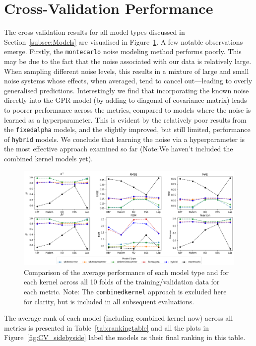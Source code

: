 \documentclass{ucdgradtaughtthesis}
\begin{document}
\section{Cross-Validation Performance}
The cross validation results for all model types discussed in Section~\ref{subsec:Models} are visualised in Figure~\ref{fig:broad_comparison}. A few notable observations emerge. Firstly, the \texttt{montecarlo} noise modeling method performs poorly.
This may be due to the fact that the noise associated with our data is relatively large. When sampling different noise levels, this results in a mixture of large and small noise systems whose effects, when averaged, tend to cancel out—leading to overly generalised predictions.
Interestingly we find that incorporating the known noise directly into the GPR model (by adding to diagonal of covariance matrix) leads to poorer performance across the metrics, compared to models where the noise is learned as a hyperparameter.
This is evident by the relatively poor results from the \texttt{fixedalpha} models, and the slightly improved, but still limited, performance of \texttt{hybrid} models.
We conclude that learning the noise via a hyperparameter is the most effective approach examined so far (Note:We haven't included the combined kernel models yet).
\begin{figure}[H]
    \centering
    \includegraphics[width=\textwidth]{LatexPlots/CV_plots/metrics_compared.png}
    \caption[Comparing average metrics over all cross validation folds between all model types.]{Comparison of the average performance of each model type and for each kernel across all 10 folds of the training/validation data for each metric. Note: The \texttt{combinedkernel} approach is excluded here for clarity, but is included in all subsequent evaluations.}
    \label{fig:broad_comparison}
\end{figure}
The average rank of each model (including combined kernel now) across all metrics is presented in Table~\ref{tab:rankingtable} and all the plots in Figure~\ref{fig:CV_sidebyside} label the models as their final ranking in this table.
\end{document}
